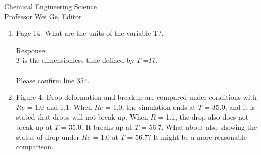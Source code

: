 \documentclass{letter}
\begin{document}
\begin{letter}{
Chemical Engineering Science\\
Professor Wei Ge, Editor\\}
\begin{enumerate}
Response: \\
Table 1 shows the comparison of the deformation parameter $D$ (Li et al., Physics of Fluids, Vol.12, 269–282, 2000) for a drop as a function of 
$Re$ ($Ca$ = 0.3, $\lambda =1$ and $\eta = 1$).
The $D$ computationally obtained by Li et al. (2000) is regarded as a benchmark problem in this field. First, we compared the $D$ by Li et al. (2000) 
with our computational results. Also, In Fig. 2,  we compared the appearance of drop breakup (Renardy and Cristini, 
Physics of Fluids, Vol.13, 2161–2164, 2001) with our computational results.
On the other hand, regarding quantitative physical quantities on bubble deformation and breakup, only experimental results for $D$ exist under 
the condition of $Re \simeq 0$.
Thus, As shown in Table 2, we performed the comparison of the deformation parameter $D$ for a bubble as a function of  $Ca$ 
($Re \simeq 0$, $\lambda  \simeq 0$ and $\eta  \simeq 0$). In the experiments, obtaining precise experimental data will be difficult because 
the dynamic motion of a bubble in a highly viscous liquid in an experimental device needs to be accurately set.
We don't know the cause of the difference between both experimental results, but our numerical results were close to those of Rust and 
Manga (Journal of Colloid and 
Interface Science, Vol. 249, 476– 480 2002). For your reference, computations for bubble deformation with the condition of $Re \simeq 0$ 
were hard tasks and a very long computational time (one year) was needed. \\
\\

\par\noindent
\item
\textsf
{Page 14: What are the units of the variable T?.}
\vspace{3 mm}

Response: \\
$T$ is the dimensionless time defined by $T$ =$\mathit{\Gamma} t$. \\
\\
Please confirm line 354.
\\

\par\noindent
\item
\textsf
{Figure 4: Drop deformation and breakup are compared under conditions with $Re$ = 1.0 and 1.1. When $Re$ = 1.0, the simulation ends at $T$ = 35.0, and it is stated that drops will not break up. When $R$ = 1.1, the drop also does not break up at $T$ = 35.0. It breaks up at $T$ = 56.7. What about also showing the status of drop under $Re$ = 1.0 at $T$ = 56.7? It might be a more reasonable comparison.}
\vspace{3 mm}


\end{enumerate}
\end{letter}
\end{document}
